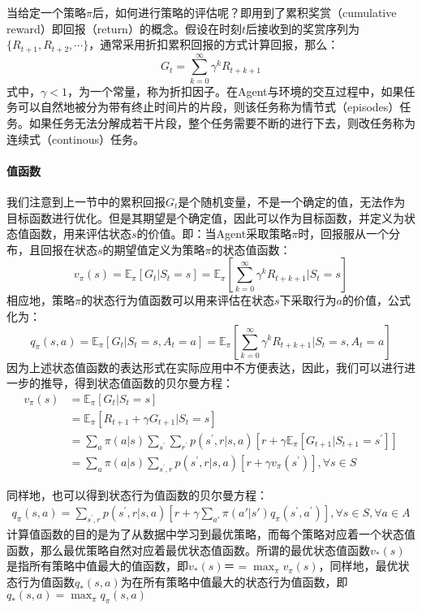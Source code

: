 当给定一个策略$\pi$后，如何进行策略的评估呢？即用到了累积奖赏（cumulative reward）即回报（return）的概念。假设在时刻$t$后接收到的奖赏序列为$\{R_{t+1}, R_{t+2},\cdots\}$，通常采用折扣累积回报的方式计算回报，那么：
\begin{equation}
G_{t}=\sum_{k=0}^{\infty}\gamma^{k}R_{t+k+1}
\end{equation}
式中，$\gamma<1$，为一个常量，称为折扣因子。在Agent与环境的交互过程中，如果任务可以自然地被分为带有终止时间片的片段，则该任务称为情节式（episodes）任务。如果任务无法分解成若干片段，整个任务需要不断的进行下去，则改任务称为连续式（continous）任务。

\paragraph{值函数}
我们注意到上一节中的累积回报$G_{t}$是个随机变量，不是一个确定的值，无法作为目标函数进行优化。但是其期望是个确定值，因此可以作为目标函数，并定义为状态值函数，用来评估状态$s$的价值。即：当Agent采取策略$\pi$时，回报服从一个分布，且回报在状态$s$的期望值定义为策略$\pi$的状态值函数：
\begin{equation}
v_{\pi}(s)=\mathbb{E}_{\pi}[G_{t}|S_t=s]=\mathbb{E}_{\pi}[\sum_{k=0}^{\infty}\gamma^{k}R_{t+k+1}|S_t=s]
\end{equation}
相应地，策略$\pi$的状态行为值函数可以用来评估在状态$s$下采取行为$a$的价值，公式化为：
\begin{equation}
\label{seq2_qsa}
q_{\pi}(s,a)=\mathbb{E}_{\pi}[G_{t}|S_t=s,A_t=a]
=\mathbb{E}_{\pi}[\sum_{k=0}^{\infty}\gamma^{k}R_{t+k+1}|S_t=s,A_t=a]
\end{equation}
因为上述状态值函数的表达形式在实际应用中不方便表达，因此，我们可以进行进一步的推导，得到状态值函数的贝尔曼方程：
\begin{equation}
\label{seq1}
\begin{aligned}
v_{\pi}(s)&=\mathbb{E}_{\pi}[G_{t}|S_t=s]\\
&=\mathbb{E}_{\pi}[R_{t+1}+\gamma G_{t+1}|S_t=s]\\
&=\sum_{a}\pi(a|s)\sum_{s^{'}}\sum_{r^{'}}p(s^{'},r|s,a)[r + \gamma\mathbb{E}_{\pi}[G_{t+1}|S_{t+1}=s^{'}]]\\
&=\sum_{a}\pi(a|s)\sum_{s^{'},r}p(s^{'},r|s,a)[r+\gamma v_{\pi}(s^{'})], \forall s \in S
\end{aligned}
\end{equation}

同样地，也可以得到状态行为值函数的贝尔曼方程：
\begin{equation}
\label{seq2}
\begin{aligned}
q_{\pi}(s,a)=\sum_{s^{'},r}p(s^{'},r|s,a)[r+\gamma \sum_{a'}\pi(a'|s') q_{\pi}(s^{'},a^{'})], \forall s \in S, \forall a \in A
\end{aligned}
\end{equation}
计算值函数的目的是为了从数据中学习到最优策略，而每个策略对应着一个状态值函数，那么最优策略自然对应着最优状态值函数。所谓的最优状态值函数$v_{*}(s)$是指所有策略中值最大的值函数，即$v_{*}(s)＝=\max_{\pi}v_{\pi}(s)$，同样地，最优状态行为值函数$q_{*}(s,a)$为在所有策略中值最大的状态行为值函数，即$q_{*}(s,a)=\max_{\pi}q_{\pi}(s,a)$

